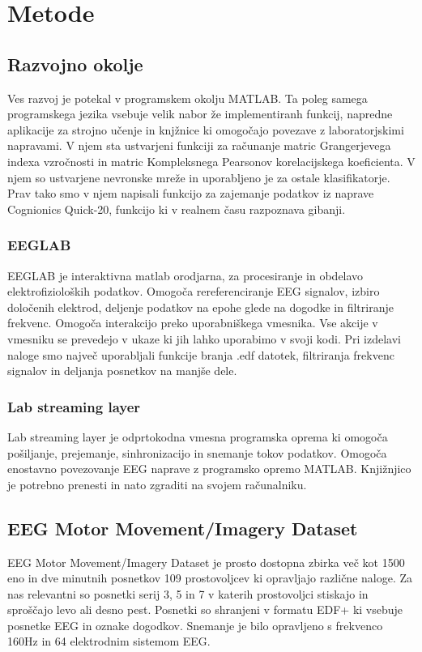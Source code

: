 \chapter{Metode}

\section{Razvojno okolje}
Ves razvoj je potekal v programskem okolju MATLAB. Ta poleg samega programskega jezika vsebuje velik nabor že implementiranh funkcij, napredne aplikacije za strojno učenje in knjžnice ki omogočajo povezave z laboratorjskimi napravami. V njem sta ustvarjeni funkciji za računanje matric Grangerjevega indexa vzročnosti
in matric Kompleksnega Pearsonov korelacijskega koeficienta. V njem so ustvarjene nevronske mreže in uporabljeno je za ostale klasifikatorje. Prav tako smo v njem napisali funkcijo za zajemanje podatkov iz naprave Cognionics Quick-20, funkcijo ki v realnem času razpoznava gibanji.
    
\subsection{EEGLAB}
EEGLAB je interaktivna matlab orodjarna, za procesiranje in obdelavo elektrofizioloških podatkov. Omogoča rereferenciranje EEG signalov, izbiro določenih elektrod, deljenje podatkov na epohe glede na dogodke in filtriranje frekvenc. Omogoča interakcijo preko uporabniškega vmesnika. Vse akcije v vmesniku se prevedejo v ukaze ki jih lahko uporabimo v svoji kodi. Pri izdelavi naloge smo največ uporabljali funkcije branja .edf datotek, filtriranja frekvenc signalov in deljanja posnetkov na manjše dele.\cite{noauthor_eeglab_nodate}

\subsection{Lab streaming layer}
Lab streaming layer je odprtokodna vmesna programska oprema ki omogoča pošiljanje, prejemanje, sinhronizacijo in snemanje tokov podatkov. Omogoča enostavno povezovanje EEG naprave z programsko opremo MATLAB. Knjižnjico je potrebno prenesti in nato zgraditi na svojem računalniku.  \cite{noauthor_lsl-website_nodate}

\section{EEG Motor Movement/Imagery Dataset}
EEG Motor Movement/Imagery Dataset je prosto dostopna zbirka več kot 1500 eno in dve minutnih posnetkov 109 prostovoljcev ki opravljajo različne naloge. Za nas relevantni so posnetki serij 3, 5 in 7 v katerih prostovoljci stiskajo in sproščajo levo ali desno pest. Posnetki so shranjeni v formatu EDF+ ki vsebuje posnetke EEG in oznake dogodkov. Snemanje je bilo opravljeno s frekvenco 160Hz in 64 elektrodnim sistemom EEG.\cite{schalk_eeg_2009,schalk_bci2000_2004}

